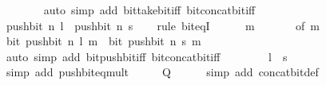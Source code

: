 \begin{isabellebody}
\ \ \ \ \ \ \isamarkupfalse%
\ {\isacharparenleft}{\kern0pt}auto\ simp\ add{\isacharcolon}{\kern0pt}\ bit{\isacharunderscore}{\kern0pt}take{\isacharunderscore}{\kern0pt}bit{\isacharunderscore}{\kern0pt}iff\ bit{\isacharunderscore}{\kern0pt}concat{\isacharunderscore}{\kern0pt}bit{\isacharunderscore}{\kern0pt}iff{\isacharparenright}{\kern0pt}\isanewline
\ \ \isamarkupfalse%
\isanewline
\ \ \isamarkupfalse%
\ \isamarkupfalse%
\ {\isacartoucheopen}push{\isacharunderscore}{\kern0pt}bit\ n\ l\ {\isacharequal}{\kern0pt}\ push{\isacharunderscore}{\kern0pt}bit\ n\ s{\isacartoucheclose}\isanewline
\ \ \isamarkupfalse%
\ {\isacharparenleft}{\kern0pt}rule\ bit{\isacharunderscore}{\kern0pt}eqI{\isacharparenright}{\kern0pt}\isanewline
\ \ \ \ \isamarkupfalse%
\ m\isanewline
\ \ \ \ \isamarkupfalse%
\ {\isacharasterisk}{\kern0pt}\ {\isacharbrackleft}{\kern0pt}of\ m{\isacharbrackright}{\kern0pt}\isanewline
\ \ \ \ \isamarkupfalse%
\ {\isacartoucheopen}bit\ {\isacharparenleft}{\kern0pt}push{\isacharunderscore}{\kern0pt}bit\ n\ l{\isacharparenright}{\kern0pt}\ m\ {\isasymlongleftrightarrow}\ bit\ {\isacharparenleft}{\kern0pt}push{\isacharunderscore}{\kern0pt}bit\ n\ s{\isacharparenright}{\kern0pt}\ m{\isacartoucheclose}\isanewline
\ \ \ \ \ \ \isamarkupfalse%
\ {\isacharparenleft}{\kern0pt}auto\ simp\ add{\isacharcolon}{\kern0pt}\ bit{\isacharunderscore}{\kern0pt}push{\isacharunderscore}{\kern0pt}bit{\isacharunderscore}{\kern0pt}iff\ bit{\isacharunderscore}{\kern0pt}concat{\isacharunderscore}{\kern0pt}bit{\isacharunderscore}{\kern0pt}iff{\isacharparenright}{\kern0pt}\isanewline
\ \ \isamarkupfalse%
\isanewline
\ \ \isamarkupfalse%
\ \isamarkupfalse%
\ {\isacartoucheopen}l\ {\isacharequal}{\kern0pt}\ s{\isacartoucheclose}\isanewline
\ \ \ \ \isamarkupfalse%
\ {\isacharparenleft}{\kern0pt}simp\ add{\isacharcolon}{\kern0pt}\ push{\isacharunderscore}{\kern0pt}bit{\isacharunderscore}{\kern0pt}eq{\isacharunderscore}{\kern0pt}mult{\isacharparenright}{\kern0pt}\isanewline
\ \ \isamarkupfalse%
\ \isamarkupfalse%
\ {\isacharquery}{\kern0pt}Q\isanewline
\ \ \ \ \isamarkupfalse%
\ {\isacharparenleft}{\kern0pt}simp\ add{\isacharcolon}{\kern0pt}\ concat{\isacharunderscore}{\kern0pt}bit{\isacharunderscore}{\kern0pt}def{\isacharparenright}{\kern0pt}\isanewline
{}\isamarkupfalse%
%
\endisatagproof
{\isafoldproof}%

\end{isabellebody}
